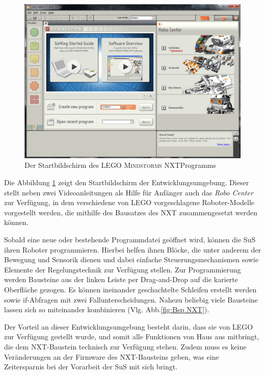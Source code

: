 \documentclass[paper=a4, DIV=calc, BCOR=15mm, twoside=on, onecolumn=on, open = right, titlepage =on, parskip =half, headsepline = on, footsepline = on, chapterprefix = off, appendixprefix = off, fontsize = 12pt, numbers = noenddot, abstract = on]{scrbook}
\begin{document}
\begin{figure}[htbp]
\centering
\includegraphics[width= \textwidth]{images/Startbildschirm_NXT.png} 
\caption[Der Startbildschirm des \textsc{LEGO} NXT-Programms]{Der Startbildschirm des \textsc{LEGO Mindstorms} NXT\-Pro\-gramms}
\label{fig:NXT Start}
\end{figure}
Die Abbildung \ref{fig:NXT Start} zeigt den Startbildschirm der Entwicklungsumgebung. Dieser stellt neben zwei Videoanleitungen als Hilfe für Anfänger auch das \emph{Robo Center} zur Verfügung, in dem verschiedene von \textsc{LEGO} vorgeschlagene Roboter-Modelle vorgestellt werden, die mithilfe des Bausatzes des NXT zusammengesetzt werden können.

Sobald eine neue oder bestehende Programmdatei geöffnet wird, können die SuS ihren Roboter programmieren. Hierbei helfen ihnen Blöcke, die unter anderem der Bewegung und Sensorik dienen und dabei einfache Steuerungsmechanismen sowie Elemente der Regelungstechnik zur Verfügung stellen. Zur Programmierung werden Bausteine aus der linken Leiste per Drag-and-Drop auf die karierte Oberfläche gezogen. Es können ineinander geschachtelte Schleifen erstellt werden sowie if-Abfragen mit zwei Fallunterscheidungen. Nahezu beliebig viele Bausteine lassen sich so miteinander kombinieren (Vlg. Abb.\ref{fig:Bsp NXT}).

Der Vorteil an dieser Entwicklungsumgebung besteht darin, dass sie von \textsc{LEGO} zur Verfügung gestellt wurde, und somit alle Funktionen von Haus aus mitbringt, die dem NXT-Baustein technisch zur Verfügung stehen. Zudem muss es keine Veränderungen an der Firmware des NXT-Bausteins geben, was eine Zeitersparnis bei der Vorarbeit der SuS mit sich bringt.
\end{document}
